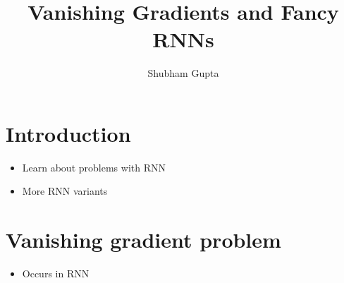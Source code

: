 \documentclass[a4paper]{article}
\title{Vanishing Gradients and Fancy RNNs}
\author{Shubham Gupta}
\begin{document}
\maketitle
\section{Introduction}
\begin{itemize}
    \item Learn about problems with RNN
    \item More RNN variants
\end{itemize}

\section{Vanishing gradient problem}
\begin{itemize}
    \item Occurs in RNN
\end{itemize}
\end{document}
